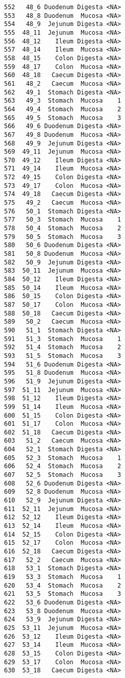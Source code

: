 \documentclass[
  letterpaper,
  DIV=11,
  numbers=noendperiod]{scrartcl}
\begin{document}
\begin{verbatim}
552   48_6 Duodenum Digesta <NA>
553   48_8 Duodenum  Mucosa <NA>
554   48_9  Jejunum Digesta <NA>
555  48_11  Jejunum  Mucosa <NA>
556  48_12    Ileum Digesta <NA>
557  48_14    Ileum  Mucosa <NA>
558  48_15    Colon Digesta <NA>
559  48_17    Colon  Mucosa <NA>
560  48_18   Caecum Digesta <NA>
561   48_2   Caecum  Mucosa <NA>
562   49_1  Stomach Digesta <NA>
563   49_3  Stomach  Mucosa    1
564   49_4  Stomach  Mucosa    2
565   49_5  Stomach  Mucosa    3
566   49_6 Duodenum Digesta <NA>
567   49_8 Duodenum  Mucosa <NA>
568   49_9  Jejunum Digesta <NA>
569  49_11  Jejunum  Mucosa <NA>
570  49_12    Ileum Digesta <NA>
571  49_14    Ileum  Mucosa <NA>
572  49_15    Colon Digesta <NA>
573  49_17    Colon  Mucosa <NA>
574  49_18   Caecum Digesta <NA>
575   49_2   Caecum  Mucosa <NA>
576   50_1  Stomach Digesta <NA>
577   50_3  Stomach  Mucosa    1
578   50_4  Stomach  Mucosa    2
579   50_5  Stomach  Mucosa    3
580   50_6 Duodenum Digesta <NA>
581   50_8 Duodenum  Mucosa <NA>
582   50_9  Jejunum Digesta <NA>
583  50_11  Jejunum  Mucosa <NA>
584  50_12    Ileum Digesta <NA>
585  50_14    Ileum  Mucosa <NA>
586  50_15    Colon Digesta <NA>
587  50_17    Colon  Mucosa <NA>
588  50_18   Caecum Digesta <NA>
589   50_2   Caecum  Mucosa <NA>
590   51_1  Stomach Digesta <NA>
591   51_3  Stomach  Mucosa    1
592   51_4  Stomach  Mucosa    2
593   51_5  Stomach  Mucosa    3
594   51_6 Duodenum Digesta <NA>
595   51_8 Duodenum  Mucosa <NA>
596   51_9  Jejunum Digesta <NA>
597  51_11  Jejunum  Mucosa <NA>
598  51_12    Ileum Digesta <NA>
599  51_14    Ileum  Mucosa <NA>
600  51_15    Colon Digesta <NA>
601  51_17    Colon  Mucosa <NA>
602  51_18   Caecum Digesta <NA>
603   51_2   Caecum  Mucosa <NA>
604   52_1  Stomach Digesta <NA>
605   52_3  Stomach  Mucosa    1
606   52_4  Stomach  Mucosa    2
607   52_5  Stomach  Mucosa    3
608   52_6 Duodenum Digesta <NA>
609   52_8 Duodenum  Mucosa <NA>
610   52_9  Jejunum Digesta <NA>
611  52_11  Jejunum  Mucosa <NA>
612  52_12    Ileum Digesta <NA>
613  52_14    Ileum  Mucosa <NA>
614  52_15    Colon Digesta <NA>
615  52_17    Colon  Mucosa <NA>
616  52_18   Caecum Digesta <NA>
617   52_2   Caecum  Mucosa <NA>
618   53_1  Stomach Digesta <NA>
619   53_3  Stomach  Mucosa    1
620   53_4  Stomach  Mucosa    2
621   53_5  Stomach  Mucosa    3
622   53_6 Duodenum Digesta <NA>
623   53_8 Duodenum  Mucosa <NA>
624   53_9  Jejunum Digesta <NA>
625  53_11  Jejunum  Mucosa <NA>
626  53_12    Ileum Digesta <NA>
627  53_14    Ileum  Mucosa <NA>
628  53_15    Colon Digesta <NA>
629  53_17    Colon  Mucosa <NA>
630  53_18   Caecum Digesta <NA>

\end{verbatim}
\end{document}

